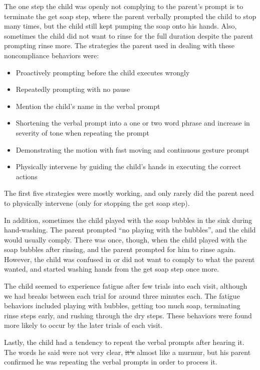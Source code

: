 \documentclass{ut-thesis}
\providecommand{\DIFaddtex}[1]{{\protect\color{blue}\uwave{#1}}} %
\providecommand{\DIFdeltex}[1]{{\protect\color{red}\sout{#1}}}                      %
\providecommand{\DIFaddbegin}{} %
\providecommand{\DIFaddend}{} %
\providecommand{\DIFdelbegin}{} %
\providecommand{\DIFdelend}{} %
\providecommand{\DIFadd}[1]{\texorpdfstring{\DIFaddtex{#1}}{#1}} %
\providecommand{\DIFdel}[1]{\texorpdfstring{\DIFdeltex{#1}}{}} %
\begin{document}
The one step the child was openly not complying to the parent's prompt is to terminate the get soap step, where the parent verbally prompted the child to stop many times, but the child still kept pumping the soap onto his hands.  Also, sometimes the child did not want to rinse for the full duration despite the parent prompting rinse more.  The strategies the parent used in dealing with these noncompliance behaviors were:
\begin{itemize}
	\item Proactively prompting before the child executes wrongly
	\item Repeatedly prompting with no pause
	\item Mention the child's name in the verbal prompt
	\item Shortening the verbal prompt into a one or two word phrase and increase in severity of tone when repeating the prompt
	\item Demonstrating the motion with fast moving and continuous gesture prompt
	\item Physically intervene by guiding the child's hands in executing the correct actions
\end{itemize}
The first five strategies were mostly working, and only rarely did the parent need to physically intervene (only for stopping the get soap step).

In addition, sometimes the child played with the soap bubbles in the sink during hand-washing.  The parent prompted ``no playing with the bubbles'', and the child would usually comply.  There was once, though, when the child played with the soap bubbles after rinsing, and the parent prompted for him to rinse again.  However, the child was confused in or did not want to comply to what the parent wanted, and started washing hands from the get soap step once more.

The child seemed to experience fatigue after few trials into each visit, although we had breaks between each trial for around three minutes each.  The fatigue behaviors included playing with bubbles, getting too much soap, terminating rinse steps early, and rushing through the dry steps.  These behaviors were found more likely to occur by the later trials of each visit.

Lastly, the child had a tendency to repeat the verbal prompts after hearing it.  The words he said were not very clear, \DIFdelbegin \DIFdel{it's }\DIFdelend \DIFaddbegin \DIFadd{they were }\DIFaddend almost like a murmur, but his parent confirmed he was repeating the verbal prompts in order to process it.
\end{document}
